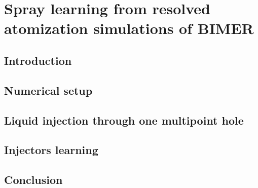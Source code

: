 \chapter{Spray learning from resolved atomization simulations of BIMER}
	\label{ch:bimer_test_bench}

\section{Introduction}

\section{Numerical setup}

\section{Liquid injection through one multipoint hole}

\section{Injectors learning}

\section{Conclusion}
